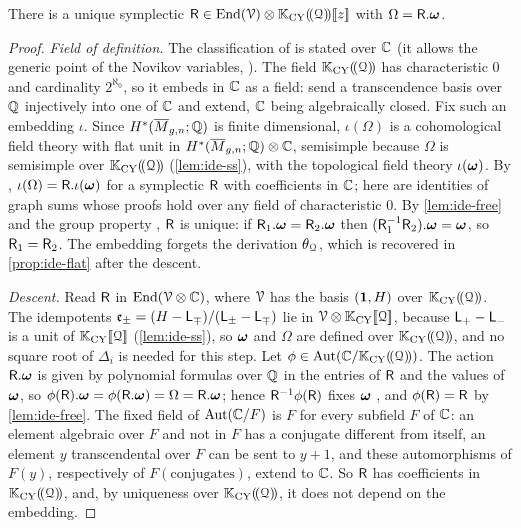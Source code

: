 \begin{prop}
\label{prop:ide-teleman}
There is a unique symplectic $\mathsf{R}\in\operatorname{End}(\mathcal{V})\otimes\mathbb{K}_{\mathrm{CY}}(\!(\mathcal{Q})\!)[\![ z ]\!]$ with $\Omega=\mathsf{R}.\boldsymbol{\omega}$.
\end{prop}
\begin{proof}
\emph{Field of definition.} The classification of \cite{Tel12} is stated over $\mathbb{C}$ (it allows the generic point of the Novikov variables, \cite[(1.6)]{Tel12}). The field $\mathbb{K}_{\mathrm{CY}}(\!(\mathcal{Q})\!)$ has characteristic $0$ and cardinality $2^{\aleph_0}$, so it embeds in $\mathbb{C}$ as a field: send a transcendence basis over $\mathbb{Q}$ injectively into one of $\mathbb{C}$ and extend, $\mathbb{C}$ being algebraically closed. Fix such an embedding $\iota$. Since $H^*(\overline{M}_{g,n};\mathbb{Q})$ is finite dimensional, $\iota(\Omega)$ is a cohomological field theory with flat unit in $H^*(\overline{M}_{g,n};\mathbb{Q})\otimes\mathbb{C}$, semisimple because $\Omega$ is semisimple over $\mathbb{K}_{\mathrm{CY}}(\!(\mathcal{Q})\!)$ (\cref{lem:ide-ss}), with the topological field theory $\iota(\boldsymbol{\omega})$. By \cite[(1.15), Theorem~(2), Prop.~8.7(ii)]{Tel12}, $\iota(\Omega)=\mathsf{R}.\iota(\boldsymbol{\omega})$ for a symplectic $\mathsf{R}$ with coefficients in $\mathbb{C}$; here \cite[Defs.~2.2, 2.5, 2.13 and Prop.~2.14]{PPZ15} are identities of graph sums whose proofs hold over any field of characteristic $0$. By \cref{lem:ide-free} and the group property \cite[Prop.~2.14]{PPZ15}, $\mathsf{R}$ is unique: if $\mathsf{R}_1.\boldsymbol{\omega}=\mathsf{R}_2.\boldsymbol{\omega}$ then $(\mathsf{R}_1^{-1}\mathsf{R}_2).\boldsymbol{\omega}=\boldsymbol{\omega}$, so $\mathsf{R}_1=\mathsf{R}_2$. The embedding forgets the derivation $\theta_{\mathcal{Q}}$, which is recovered in \cref{prop:ide-flat} after the descent.

\emph{Descent.} Read $\mathsf{R}$ in $\operatorname{End}(\mathcal{V}\otimes\mathbb{C})$, where $\mathcal{V}$ has the basis $(\mathbf{1},H)$ over $\mathbb{K}_{\mathrm{CY}}(\!(\mathcal{Q})\!)$. The idempotents $\mathfrak{e}_\pm=(H-\mathsf{L}_\mp)/(\mathsf{L}_\pm-\mathsf{L}_\mp)$ lie in $\mathcal{V}\otimes\mathbb{K}_{\mathrm{CY}}[\![ \mathcal{Q} ]\!]$, because $\mathsf{L}_+-\mathsf{L}_-$ is a unit of $\mathbb{K}_{\mathrm{CY}}[\![ \mathcal{Q} ]\!]$ (\cref{lem:ide-ss}), so $\boldsymbol{\omega}$ and $\Omega$ are defined over $\mathbb{K}_{\mathrm{CY}}(\!(\mathcal{Q})\!)$, and no square root of $\Delta_i$ is needed for this step. Let $\phi\in\operatorname{Aut}(\mathbb{C}/\mathbb{K}_{\mathrm{CY}}(\!(\mathcal{Q})\!))$. The action $\mathsf{R}.\boldsymbol{\omega}$ is given by polynomial formulas over $\mathbb{Q}$ in the entries of $\mathsf{R}$ and the values of $\boldsymbol{\omega}$, so $\phi(\mathsf{R}).\boldsymbol{\omega}=\phi(\mathsf{R}.\boldsymbol{\omega})=\Omega=\mathsf{R}.\boldsymbol{\omega}$; hence $\mathsf{R}^{-1}\phi(\mathsf{R})$ fixes $\boldsymbol{\omega}$ \cite[Prop.~2.14]{PPZ15}, and $\phi(\mathsf{R})=\mathsf{R}$ by \cref{lem:ide-free}. The fixed field of $\operatorname{Aut}(\mathbb{C}/F)$ is $F$ for every subfield $F$ of $\mathbb{C}$: an element algebraic over $F$ and not in $F$ has a conjugate different from itself, an element $y$ transcendental over $F$ can be sent to $y+1$, and these automorphisms of $F(y)$, respectively of $F(\text{conjugates})$, extend to $\mathbb{C}$. So $\mathsf{R}$ has coefficients in $\mathbb{K}_{\mathrm{CY}}(\!(\mathcal{Q})\!)$, and, by uniqueness over $\mathbb{K}_{\mathrm{CY}}(\!(\mathcal{Q})\!)$, it does not depend on the embedding.
\end{proof}

